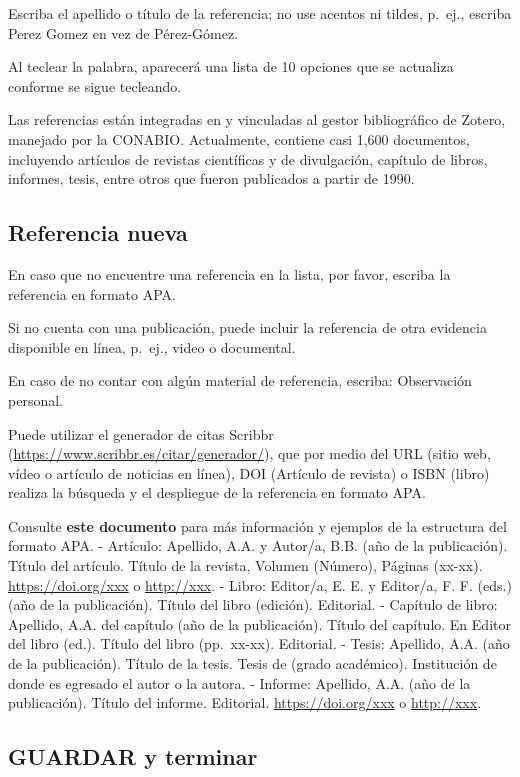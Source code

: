 \documentclass[
]{book}
\begin{document}
Escriba el apellido o título de la referencia; no use acentos ni tildes, p.~ej., escriba Perez Gomez en vez de Pérez-Gómez.

Al teclear la palabra, aparecerá una lista de 10 opciones que se actualiza conforme se sigue tecleando.

Las referencias están integradas en y vinculadas al gestor bibliográfico de Zotero, manejado por la CONABIO. Actualmente, contiene casi 1,600 documentos, incluyendo artículos de revistas científicas y de divulgación, capítulo de libros, informes, tesis, entre otros que fueron publicados a partir de 1990.

\hypertarget{referencia-nueva}{%
\subsection{Referencia nueva}\label{referencia-nueva}}

En caso que no encuentre una referencia en la lista, por favor, escriba la referencia en formato APA.

Si no cuenta con una publicación, puede incluir la referencia de otra evidencia disponible en línea, p.~ej., video o documental.

En caso de no contar con algún material de referencia, escriba: Observación personal.

Puede utilizar el generador de citas Scribbr (\url{https://www.scribbr.es/citar/generador/}), que por medio del URL (sitio web, vídeo o artículo de noticias en línea), DOI (Artículo de revista) o ISBN (libro) realiza la búsqueda y el despliegue de la referencia en formato APA.

Consulte \textbf{este documento} para más información y ejemplos de la estructura del formato APA.
- Artículo: Apellido, A.A. y Autor/a, B.B. (año de la publicación). Título del artículo. Título de la revista, Volumen (Número), Páginas (xx-xx). \url{https://doi.org/xxx} o \url{http://xxx}.
- Libro: Editor/a, E. E. y Editor/a, F. F. (eds.) (año de la publicación). Título del libro (edición). Editorial.
- Capítulo de libro: Apellido, A.A. del capítulo (año de la publicación). Título del capítulo. En Editor del libro (ed.). Título del libro (pp.~xx-xx). Editorial.
- Tesis: Apellido, A.A. (año de la publicación). Título de la tesis. Tesis de (grado académico). Institución de donde es egresado el autor o la autora.
- Informe: Apellido, A.A. (año de la publicación). Título del informe. Editorial. \url{https://doi.org/xxx} o \url{http://xxx}.

\hypertarget{guardar-y-terminar}{%
\subsection{GUARDAR y terminar}\label{guardar-y-terminar}}
\end{document}

